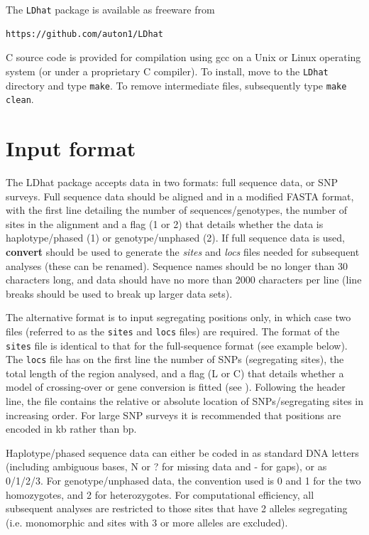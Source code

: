 \documentclass[a4paper,10pt,fullpage]{article}
\begin{document}
The \verb+LDhat+ package is available as freeware from
\begin{verbatim}
https://github.com/auton1/LDhat
\end{verbatim}
\noindent C source code is provided for compilation using gcc on a Unix or Linux
operating system (or under a proprietary C compiler).  To install, move to the \verb+LDhat+ directory and type \verb+make+.  To remove
intermediate files, subsequently type \verb+make clean+.


\section{Input format}
The LDhat package accepts data in two formats: full sequence data,
or SNP surveys.  Full sequence data should be aligned and in a
modified FASTA format, with the first line detailing the number of
sequences/genotypes, the number of sites in the alignment and a
flag (1 or 2) that details whether the data is haplotype/phased
(1) or genotype/unphased (2). If full sequence data is used, {\bf
convert} should be used to generate the {\it sites} and {\it locs}
files needed for subsequent analyses (these can be renamed).
Sequence names should be no longer than 30 characters long, and
data should have no more than 2000 characters per line (line
breaks should be used to break up larger data sets).

The alternative format is to input segregating positions only, in
which case two files (referred to as the {\verb+sites+} and {\verb+locs+} files) are required.  The format of the {\verb+sites+} file is
identical to that for the full-sequence format (see example
below).  The {\verb+locs+} file has on the first line the number of
SNPs (segregating sites), the total length of the region analysed,
and a flag (L or C) that details whether a model of crossing-over
or gene conversion is fitted (see \cite{McVeanetal02}).  Following
the header line, the file contains the relative or absolute
location of SNPs/segregating sites in increasing order.  For large
SNP surveys it is recommended that positions are encoded in kb
rather than bp.

Haplotype/phased sequence data can either be coded in as standard
DNA letters (including ambiguous bases, N or ? for missing data
and - for gaps), or as 0/1/2/3.  For genotype/unphased data, the
convention used is 0 and 1 for the two homozygotes, and 2 for
heterozygotes.  For computational efficiency, all subsequent
analyses are restricted to those sites that have 2 alleles
segregating (i.e. monomorphic and sites with 3 or more alleles are
excluded). \\\\
\end{document}
